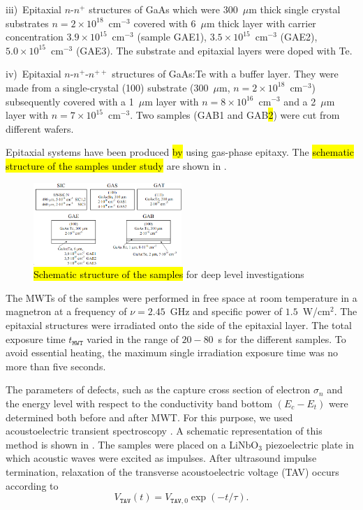 \documentclass[10pt]{iopart}
\begin{document}
\noindent
iii)~Epitaxial $n$-$n^+$ structures of GaAs which were 300~$\mu$m thick single crystal substrates $n = 2 \times10^{18}$~cm$^{-3}$
   covered with 6~$\mu$m thick layer with carrier concentration $3.9\times10^{15}$~cm$^{-3}$
   (sample GAE1), $3.5\times10^{15}$~cm$^{-3}$ (GAE2),
   $5.0\times10^{15}$~cm$^{-3}$ (GAE3).
   The substrate and epitaxial layers were doped with Te.

\noindent
iv)~Epitaxial $n$-$n^+$-$n^{++}$ structures of GaAs:Te with a buffer layer.
 They were made from a single-crystal (100) substrate (300~$\mu$m, $n= 2\times10^{18}$~cm$^{-3}$)
  subsequently covered with a 1~$\mu$m layer with $n=8\times10^{16}$~cm$^{-3}$ and
  a 2~$\mu$m layer with $n=7\times10^{15}$~cm$^{-3}$.
  Two samples (GAB1 and GAB\hl{2}) were cut from different wafers.

Epitaxial systems have been produced \hl{by} using gas-phase epitaxy.
The \hl{schematic structure of the samples under study} are shown in .

\begin{figure}
\includegraphics[width=0.5\textwidth]{Fig1}
\caption{\label{figSamp_TAV}
\hl{Schematic structure of the samples} for deep level investigations
}%
\end{figure}

The MWTs of the samples were performed in free space at room temperature in a magnetron at a frequency of  $\nu=2.45$~GHz
and specific power of $1.5$~W/cm$^{2}$.
The epitaxial structures were irradiated onto the side of the epitaxial layer.
The total exposure time $t_\mathtt{MWT}$ varied in the range of $20-80$~s for the different samples.
To avoid essential heating, the maximum single irradiation exposure time was no more than  five seconds.

The parameters of defects, such as the capture cross section of electron $\sigma_n$
and the energy level with respect to the conductivity band bottom $(E_c-E_t)$ were determined both before and after MWT.
For this purpose, we used acoustoelectric transient spectroscopy \cite{OstrovPAN,OlikhSSC,PANnewEn,OstrovskiiSST}.
A schematic representation of this method is shown in .
The samples were placed on a LiNbO$_3$ piezoelectric plate in which acoustic waves were excited as impulses.
After ultrasound impulse termination, relaxation of the transverse  acoustoelectric voltage (TAV) occurs according to
\begin{equation}\label{eqVtav}
  V_\mathtt{TAV}(t)=V_{\mathtt{TAV},0}\exp(-t/\tau).
\end{equation}
\end{document}
